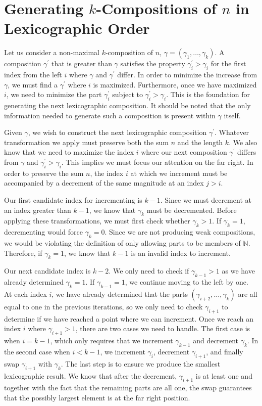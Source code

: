 \section{Generating $k$-Compositions of $n$ in Lexicographic Order}
\label{sec:generating-k-compositions}

Let us consider a non-maximal $k$-composition of $n$, $\gamma = (\gamma_1, \dots, \gamma_k)$. A composition $\gamma^{\prime}$ that is greater than $\gamma$ satisfies the property $\gamma^{\prime}_i > \gamma_i$ for the first index from the left $i$ where $\gamma$ and $\gamma^{\prime}$ differ. In order to minimize the increase from $\gamma$, we must find a $\gamma^{\prime}$ where $i$ is maximized. Furthermore, once we have maximized $i$, we need to minimize the part $\gamma^{\prime}_i$ subject to $\gamma^{\prime}_i > \gamma_i$. This is the foundation for generating the next lexicographic composition. It should be noted that the only information needed to generate such a composition is present within $\gamma$ itself.

Given $\gamma$, we wish to construct the next lexicographic composition $\gamma^{\prime}$. Whatever transformation we apply must preserve both the sum $n$ and the length $k$. We also know that we need to maximize the index $i$ where our next composition $\gamma^{\prime}$ differs from $\gamma$ and $\gamma^{\prime}_i > \gamma_i$. This implies we must focus our attention on the far right. In order to preserve the sum $n$, the index $i$ at which we increment must be accompanied by a decrement of the same magnitude at an index $j > i$.

Our first candidate index for incrementing is $k - 1$. Since we must decrement at an index greater than $k - 1$, we know that $\gamma_k$ must be decremented. Before applying these transformations, we must first check whether $\gamma_k > 1$. If $\gamma_k = 1$, decrementing would force $\gamma_k = 0$. Since we are not producing weak compositions, we would be violating the definition of only allowing parts to be members of $\mathbb{N}$. Therefore, if $\gamma_k = 1$, we know that $k - 1$ is an invalid index to increment.

Our next candidate index is $k - 2$. We only need to check if $\gamma_{k - 1} > 1$ as we have already determined $\gamma_{k} = 1$. If $\gamma_{k - 1} = 1$, we continue moving to the left by one. At each index $i$, we have already determined that the parts $(\gamma_{i + 2}, \dots, \gamma_k)$ are all equal to one in the previous iterations, so we only need to check $\gamma_{i + 1}$ to determine if we have reached a point where we can increment. Once we reach an index $i$ where $\gamma_{i + 1} > 1$, there are two cases we need to handle. The first case is when $i = k - 1$, which only requires that we increment $\gamma_{k - 1}$ and decrement $\gamma_k$. In the second case when $i < k - 1$, we increment $\gamma_i$, decrement $\gamma_{i + 1}$, and finally swap $\gamma_{i + 1}$ with $\gamma_k$. The last step is to ensure we produce the smallest lexicographic result. We know that after the decrement, $\gamma_{i + 1}$ is at least one and together with the fact that the remaining parts are all one, the swap guarantees that the possibly largest element is at the far right position.

